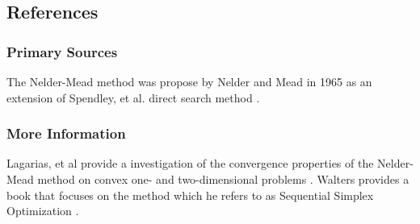 \subsection{References}

\subsubsection{Primary Sources}
The Nelder-Mead method was propose by Nelder and Mead in 1965 \cite{Nelder1965} as an extension of Spendley, et al. direct search method \cite{Spendley1962}.

\subsubsection{More Information}
Lagarias, et al provide a investigation of the convergence properties of the Nelder-Mead method on convex one- and two-dimensional problems \cite{Lagarias1998}.
Walters provides a book that focuses on the method which he refers to as Sequential Simplex Optimization \cite{Walters1991}.

